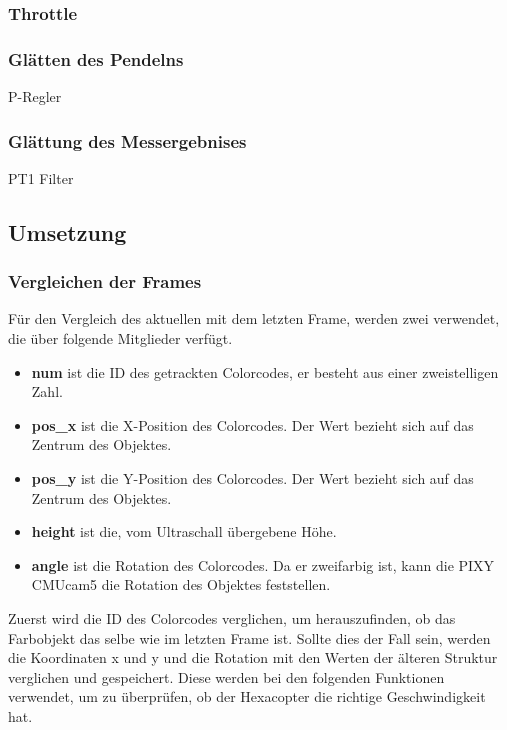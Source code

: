 
    \subsubsection{Throttle}

    \subsubsection{Glätten des Pendelns}

    P-Regler

    \subsubsection{Glättung des Messergebnises}

    PT1 Filter


  \subsection{Umsetzung}

    \subsubsection{Vergleichen der Frames}
    Für den Vergleich des aktuellen mit dem letzten Frame, werden zwei  verwendet, die über folgende Mitglieder verfügt. \cite{Structs}
    \begin{itemize}
      \item \textbf{num} ist die ID des getrackten Colorcodes, er besteht aus einer zweistelligen Zahl.
      \item \textbf{pos\_x} ist die X-Position des Colorcodes. Der Wert bezieht sich auf das Zentrum des Objektes.
      \item \textbf{pos\_y} ist die Y-Position des Colorcodes. Der Wert bezieht sich auf das Zentrum des Objektes.
      \item \textbf{height} ist die, vom Ultraschall übergebene Höhe.
      \item \textbf{angle} ist die Rotation des Colorcodes. Da er zweifarbig ist, kann die PIXY CMUcam5 die Rotation des Objektes feststellen.
    \end{itemize}

    Zuerst wird die ID des Colorcodes verglichen, um herauszufinden, ob das Farbobjekt das selbe wie im letzten Frame ist.
    Sollte dies der Fall sein, werden die Koordinaten x und y und die Rotation mit den Werten der älteren Struktur verglichen und gespeichert.
    Diese werden bei den folgenden Funktionen verwendet, um zu überprüfen, ob der Hexacopter die richtige Geschwindigkeit hat.

